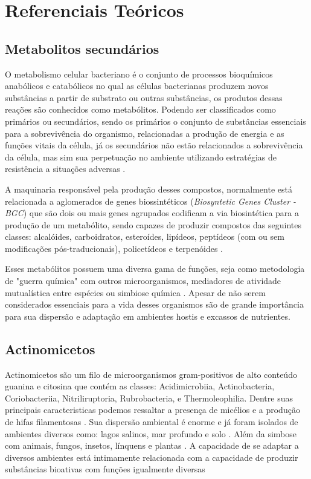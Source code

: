 \chapter{Referenciais Teóricos}
\label{cap:referenciais_teoricos}

\section{Metabolitos secundários}

O metabolismo celular bacteriano é o conjunto de processos bioquímicos anabólicos e catabólicos no qual
as células bacterianas produzem novos substâncias a partir de substrato ou outras substâncias, os produtos
dessas reações são conhecidos como metabólitos. Podendo ser classificados como primários ou secundários, 
sendo os primários o conjunto de substâncias essenciais para a sobrevivência do organismo, relacionadas 
a produção de energia e as funções vitais da célula, já os secundários não estão relacionados a sobrevivência
da célula, mas sim sua perpetuação no ambiente utilizando estratégias de resistência a situações adversas \cite{gokulan2014}.  

A maquinaria responsável pela produção desses compostos, normalmente está relacionada a aglomerados 
de genes biossintéticos (\textit{Biosyntetic Genes Cluster - BGC}) que são dois ou mais genes 
agrupados codificam a via biosintética para a produção de um metabólito, sendo capazes de produzir compostos
das seguintes classes: alcalóides, carboidratos, esteroídes, lipídeos, peptídeos (com ou sem modificações pós-traducionais), policetídeos e
terpenóides \cite{medema2015}. 

Esses metabólitos possuem uma diversa gama de funções, seja como metodologia de "guerra
química" com outros microorganismos, mediadores de atividade mutualística entre espécies ou
simbiose química \cite{obrien2011}. Apesar de não serem considerados essenciais para a vida 
desses organismos \cite{demain2009} são de grande importância para sua dispersão e adaptação
em ambientes hostis e excassos de nutrientes. 

\section{Actinomicetos}

Actinomicetos são um filo de microorganismos gram-positivos de alto conteúdo
guanina e citosina que contém as classes: Acidimicrobiia, Actinobacteria, 
Coriobacteriia, Nitriliruptoria, Rubrobacteria, e Thermoleophilia\cite{yadav2018}.
Dentre suas principais caracteristicas podemos ressaltar a presença de micélios
e a produção de hifas filamentosas \cite{chater2016}. Sua dispersão ambiental é enorme
e já foram isolados de ambientes diversos como: lagos salinos, mar profundo e solo \cite{flores2021,felicio2021,sapkota2020}.
Além da simbose com animais, fungos, insetos, línquens e plantas \cite{hei2021,van2017}.
A capacidade de se adaptar a diversos ambientes está intimamente relacionada com a capacidade
de produzir substâncias bioativas com funções igualmente diversas  \cite{van2020}

